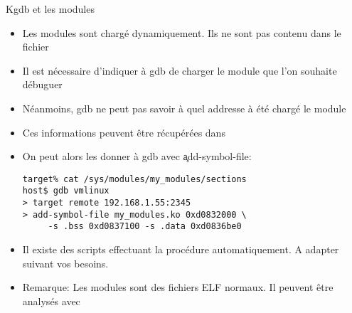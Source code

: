 \begin{frame}[fragile=singleslide]{Kgdb et les modules}
  \begin{itemize} 
  \item Les modules sont chargé dynamiquement. Ils ne sont pas contenu
    dans le fichier 
  \item Il  est nécessaire d'indiquer à  gdb de charger  le module que
    l'on souhaite débuguer
  \item Néanmoins, gdb ne peut pas savoir à quel addresse à été chargé
    le module
  \item    Ces    informations    peuvent   être    récupérées    dans
  \item On peut alors les donner à gdb avec \c{add-symbol-file}:
    \begin{lstlisting} 
target% cat /sys/modules/my_modules/sections
host$ gdb vmlinux
> target remote 192.168.1.55:2345
> add-symbol-file my_modules.ko 0xd0832000 \
     -s .bss 0xd0837100 -s .data 0xd0836be0
    \end{lstlisting} 
  \item    Il   existe   des    scripts   effectuant    la   procédure
    automatiquement. A adapter suivant vos besoins.
  \item  Remarque:  Les modules  sont  des  fichiers  ELF normaux.  Il
    peuvent être analysés avec \cmd{objdump}
  \end{itemize}
\end{frame} 




